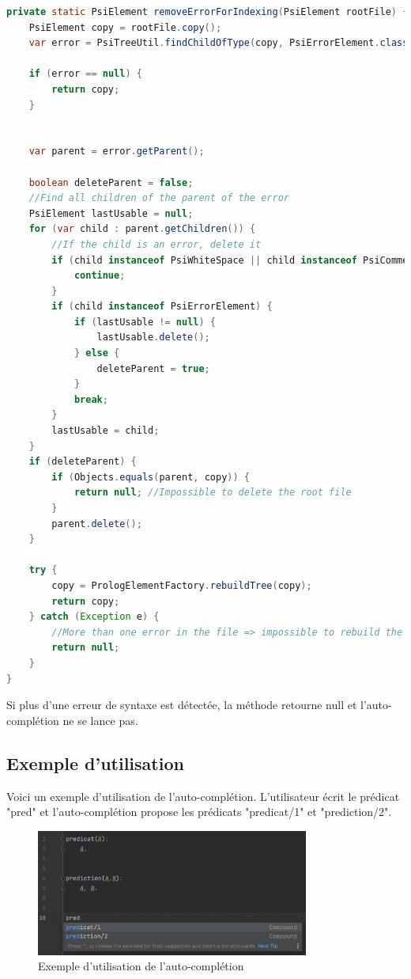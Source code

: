 \begin{lstlisting}[language=java, caption={Méthode de correction des erreurs de syntaxe}, label={lst:correction_erreur}]
private static PsiElement removeErrorForIndexing(PsiElement rootFile) {
    PsiElement copy = rootFile.copy();
    var error = PsiTreeUtil.findChildOfType(copy, PsiErrorElement.class);

    if (error == null) {
        return copy;
    }


    var parent = error.getParent();

    boolean deleteParent = false;
    //Find all children of the parent of the error
    PsiElement lastUsable = null;
    for (var child : parent.getChildren()) {
        //If the child is an error, delete it
        if (child instanceof PsiWhiteSpace || child instanceof PsiComment) {
            continue;
        }
        if (child instanceof PsiErrorElement) {
            if (lastUsable != null) {
                lastUsable.delete();
            } else {
                deleteParent = true;
            }
            break;
        }
        lastUsable = child;
    }
    if (deleteParent) {
        if (Objects.equals(parent, copy)) {
            return null; //Impossible to delete the root file
        }
        parent.delete();
    }

    try {
        copy = PrologElementFactory.rebuildTree(copy);
        return copy;
    } catch (Exception e) {
        //More than one error in the file => impossible to rebuild the tree
        return null;
    }
}
\end{lstlisting}

\noindent Si plus d'une erreur de syntaxe est détectée, la méthode retourne null et l'auto-complétion ne se lance pas.

\subsection{Exemple d'utilisation}
\noindent Voici un exemple d'utilisation de l'auto-complétion. L'utilisateur écrit le prédicat "pred" et l'auto-complétion propose les prédicats "predicat/1" et "prediction/2".

\begin{figure}[H]
    \centering
    \includegraphics[width=0.8\textwidth]{images/auto_completion.png}
    \caption{Exemple d'utilisation de l'auto-complétion}
    \label{fig:auto_completion}
\end{figure}
